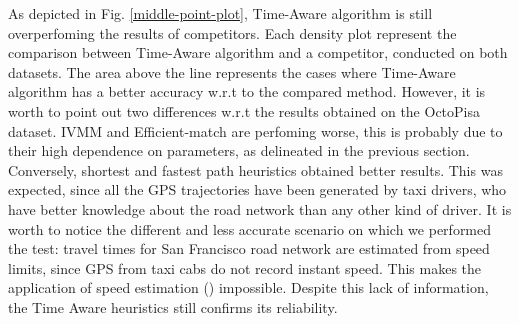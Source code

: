 \documentclass[5p]{elsarticle}
\begin{document}
As depicted in Fig. \ref{middle-point-plot}, Time-Aware algorithm is still overperfoming the results of competitors. Each density plot represent the comparison between Time-Aware 
algorithm and a competitor, conducted on both datasets. The area above the line represents the cases where Time-Aware algorithm has a better accuracy w.r.t to the compared method. 
However, it is worth to point out two differences w.r.t the results obtained on the OctoPisa dataset.
 IVMM and Efficient-match are perfoming worse, this is probably due to their high dependence on parameters, as delineated in the previous section.
 Conversely, shortest and fastest path heuristics obtained better results. This was expected, since all the GPS trajectories have been generated by taxi drivers,
 who have better knowledge about the road network than any other kind of driver. It is worth to notice the different and less accurate scenario on which we performed the test: travel times for San Francisco road network are estimated
 from speed limits, since GPS from taxi cabs do not record instant speed. This makes the application of speed estimation (\cite{cintia2013gravity}) impossible. Despite this lack of information, the Time Aware heuristics still
 confirms its reliability.
\end{document}
